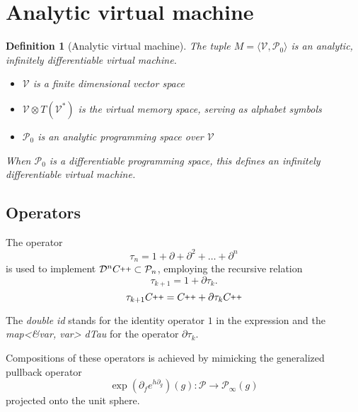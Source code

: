 \documentclass{article}
\newcommand{\VV}{\mathcal{V}}
\newcommand{\CC}{C\nolinebreak\hspace{-.05em}\raisebox{.4ex}{\tiny\bf +}\nolinebreak\hspace{-.10em}\raisebox{.4ex}{\tiny\bf +}}
\def\CC{{C\nolinebreak[4]\hspace{-.05em}\raisebox{.4ex}{\tiny\bf ++}}}
\newcommand{\dP}{\mathcal{P}}
\newcommand{\D}{\partial}
\newcommand{\DD}{\mathcal{D}}
\newcommand{\sumd}{\tau}
\newtheorem{definicija}{Definition}[section]
\begin{document}
\section{Analytic virtual machine}

\begin{definicija}[Analytic virtual machine]
The tuple $M=\langle \VV,\dP_0\rangle$ is an analytic, infinitely  differentiable virtual machine.
   
    \begin{itemize}
    \item
    $\VV$ is a finite dimensional vector space
    \item
    $\VV\otimes T(\VV^*)$ is the virtual memory space, serving as alphabet symbols
    \item
    $\dP_0$ is an analytic programming space over $\VV$
    \end{itemize}
    When $\dP_0$ is a differentiable programming space, this defines an
    infinitely differentiable virtual machine.
  \end{definicija}
  
  \subsection{Operators}
        
        The operator 
        \begin{equation}\label{eq:DD}
          	\sumd_n = 1+\D +\D^2 +\ldots + \D^n 
          \end{equation}
        is used to implement $\DD^n\CC\subset\dP_n$, employing the recursive relation
        \begin{equation}
              \label{eq:rekurzija}
              \sumd_{k+1} = 1+\D\sumd_k.
            \end{equation}
        \begin{equation}
        \sumd_{k+1}\CC = \CC+\D\sumd_k\CC
        \end{equation}
        
        The \emph{double id} stands for the identity operator $1$ in the expression and the \emph{map<\&var, var> dTau} for the operator $\D\sumd_k$.
        
        Compositions of these operators is achieved by mimicking the generalized pullback operator
        \begin{equation}\label{eq:opKompo}
          \exp(\D_fe^{h\D_g})(g): \dP\to\dP_\infty(g)
          \end{equation}
          projected onto the unit sphere.
          
\end{document}

